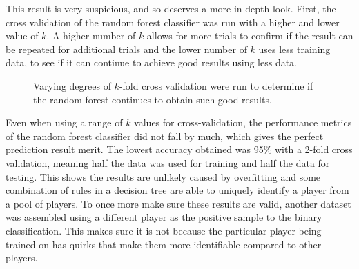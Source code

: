 \documentclass[Report.tex]{subfiles}
\begin{document}
This result is very suspicious, and so deserves a more in-depth look. First, the cross validation of the random forest classifier was run with a higher and lower value of $k$. A higher number of $k$ allows for more trials to confirm if the result can be repeated for additional trials and the lower number of $k$ uses less training data, to see if it can continue to achieve good results using less data. 

\newcommand{\rfplotbar}[2] {
\addplot+[mark=none] table [x=cv, y=#1, col sep=comma] {data/15-game-rf.csv};
\addlegendentry{#2}
}
\begin{figure}[H]
\caption{Varying degrees of $k$-fold cross validation were run to determine if the random forest continues to obtain such good results.}
\end{figure}

Even when using a range of $k$ values for cross-validation, the performance metrics of the random forest classifier did not fall by much, which gives the perfect prediction result merit. The lowest accuracy obtained was 95\% with a 2-fold cross validation, meaning half the data was used for training and half the data for testing. This shows the results are unlikely caused by overfitting and some combination of rules in a decision tree are able to uniquely identify a player from a pool of players. To once more make sure these results are valid, another dataset was assembled using a different player as the positive sample to the binary classification. This makes sure it is not because the particular player being trained on has quirks that make them more identifiable compared to other players. 
\end{document}
